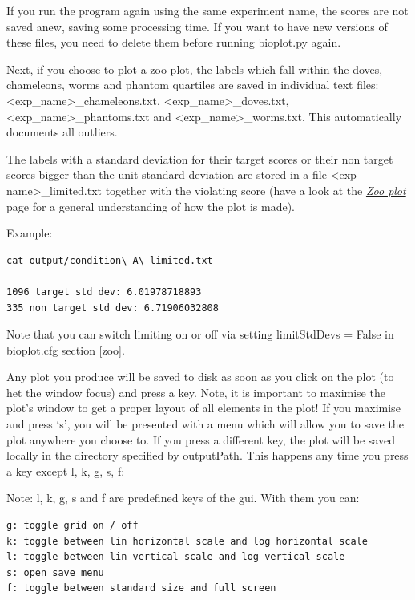 \documentclass[letterpaper,10pt,english]{sphinxmanual}
\begin{document}
If you run the program again using the same experiment
name, the scores are not saved anew, saving some processing time.
If you want to have new versions of these files, you need to delete
them before running bioplot.py again.

Next, if you choose to plot a zoo plot, the labels which fall within the
doves, chameleons, worms and phantom quartiles are saved in individual
text files: \textless{}exp\_name\textgreater{}\_chameleons.txt, \textless{}exp\_name\textgreater{}\_doves.txt,
\textless{}exp\_name\textgreater{}\_phantoms.txt and \textless{}exp\_name\textgreater{}\_worms.txt.
This automatically documents all outliers.

The labels with a standard deviation for their target scores or their
non target scores bigger than the unit standard deviation are stored
in a file \textless{}exp name\textgreater{}\_limited.txt together with the violating score (have a look
at the {\hyperref[zooplot:rst-zooplot]{\emph{Zoo plot}}} page for a general understanding of how the plot is made).

Example:

\begin{Verbatim}[commandchars=\\\{\}]
cat output/condition\_A\_limited.txt

1096 target std dev: 6.01978718893
335 non target std dev: 6.71906032808
\end{Verbatim}

Note that you can switch limiting on or off via setting limitStdDevs = False in bioplot.cfg section {[}zoo{]}.

Any plot you produce will be saved to disk as soon as you click on
the plot (to het the window focus) and press a key.
Note, it is important to maximise the plot's window to get a
proper layout of all elements in the plot! If you maximise and
press `s', you will be presented with a menu which will allow you
to save the plot anywhere you choose to.
If you press a different key, the plot will be saved locally in
the directory specified by outputPath.
This happens any time you press a key except l, k, g, s, f:

Note: l, k, g, s and f are predefined keys of the gui.
With them you can:

\begin{Verbatim}[commandchars=\\\{\}]
g: toggle grid on / off
k: toggle between lin horizontal scale and log horizontal scale
l: toggle between lin vertical scale and log vertical scale
s: open save menu
f: toggle between standard size and full screen
\end{Verbatim}
\end{document}
